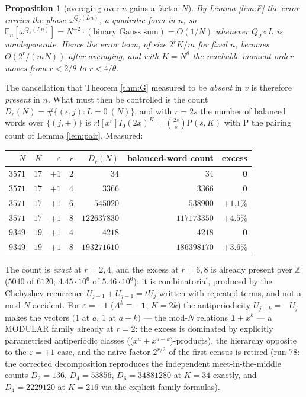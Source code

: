 \documentclass[11pt,reqno]{amsart}
\newtheorem{proposition}[theorem]{Proposition}
\theoremstyle{definition}
\newcommand{\ZZ}{\mathbb{Z}}
\begin{document}
\begin{proposition}[averaging over $n$ gains a factor $N$]\label{prop:gain}
By Lemma \ref{lem:F} the error carries the phase $\omega^{Q_J(Ln)}$, a quadratic
form in $n$, so $\mathbb E_n[\omega^{Q_J(Ln)}]=N^{-2}\cdot(\text{binary Gauss
sum})=O(1/N)$ whenever $Q_J\circ L$ is nondegenerate. Hence the error term, of
size $2^rK/m$ for fixed $n$, becomes $O(2^r/(mN))$ after averaging, and with
$K=N^\theta$ the reachable moment order moves from $r<2/\theta$ to $r<4/\theta$.
\end{proposition}

The cancellation that Theorem \ref{thm:G} measured to be \emph{absent} in $v$ is
therefore \emph{present} in $n$. What must then be controlled is the count
$D_r(N)=\#\{(\epsilon,j):L=0\ (N)\}$, and with $r=2s$ the number of balanced words
over $\{(j,\pm)\}$ is $r![x^r]I_0(2x)^K=\binom{2s}{s}\mathrm{P}(s,K)$ with
$\mathrm{P}$ the pairing count of Lemma \ref{lem:pair}. Measured:

\begin{center}\footnotesize
\begin{tabular}{@{}rrrrrrr@{}}
\toprule
$N$ & $K$ & $\varepsilon$ & $r$ & $D_r(N)$ & balanced-word count & excess\\
\midrule
$3571$ & $17$ & $+1$ & $2$ & $34$ & $34$ & $\mathbf 0$\\
$3571$ & $17$ & $+1$ & $4$ & $3366$ & $3366$ & $\mathbf 0$\\
$3571$ & $17$ & $+1$ & $6$ & $545020$ & $538900$ & $+1.1\%$\\
$3571$ & $17$ & $+1$ & $8$ & $122637830$ & $117173350$ & $+4.5\%$\\
$9349$ & $19$ & $+1$ & $4$ & $4218$ & $4218$ & $\mathbf 0$\\
$9349$ & $19$ & $+1$ & $8$ & $193271610$ & $186398170$ & $+3.6\%$\\
\bottomrule
\end{tabular}
\end{center}

\noindent
The count is \emph{exact} at $r=2,4$, and the excess at $r=6,8$ is already present
over $\ZZ$ ($5040$ of $6120$; $4.45\cdot10^6$ of $5.46\cdot10^6$): it is
combinatorial, produced by the Chebyshev recurrence
$U_{j+1}+U_{j-1}=tU_j$ written with repeated terms, and not a mod-$N$ accident.
For $\varepsilon=-1$ ($A^k\equiv-\mathbf 1$, $K=2k$) the antiperiodicity $U_{j+k}=-U_j$ makes the vectors $(1$ at $a$, $1$ at $a+k)$ --- the mod-$N$ relations $\mathbf 1 + x^k$ --- a MODULAR family already at $r=2$: the excess is dominated by explicitly parametrised antiperiodic classes (($x^a\pm x^{a+k}$)-products), the hierarchy opposite to the $\varepsilon=+1$ case, and the naive factor $2^{r/2}$ of the first census is retired (run 78: the corrected decomposition reproduces the independent meet-in-the-middle counts $D_2=136$, $D_4=53856$, $D_6=34881280$ at $K=34$ exactly, and $D_4=2229120$ at $K=216$ via the explicit family formulas).
\end{document}
